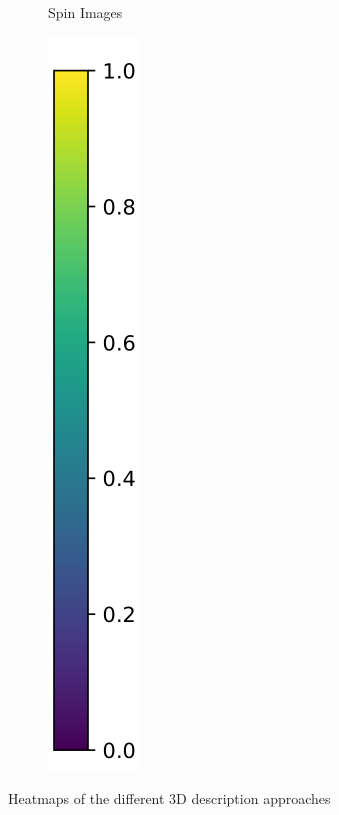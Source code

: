 \begin{figure}[t!]
\begin{subfigure}[]{0.235\textwidth}
		\caption{Spin Images}
		\label{fig:heatmap-si}
	\end{subfigure}
	\begin{subfigure}[]{0.026\textwidth}
		\vspace{-7mm}
		\includegraphics[width=\textwidth]{figures/plots/cbar}
	\end{subfigure}
	\vspace{-2mm}
	\caption{Heatmaps of the different 3D description approaches}
	\label{fig:heatmaps}
\end{figure}

